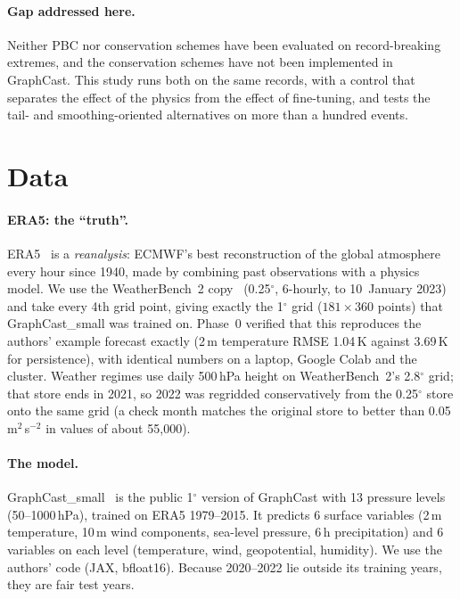 \documentclass{article}
\begin{document}
\paragraph{Gap addressed here.}
Neither PBC nor conservation schemes have been evaluated on record-breaking extremes, and the conservation schemes have
not been implemented in GraphCast. This study runs both on the same records, with a control that separates the effect
of the physics from the effect of fine-tuning, and tests the tail- and smoothing-oriented alternatives on more than a hundred events.

\section{Data}
\label{sec:data}

\paragraph{ERA5: the ``truth''.}
ERA5~\cite{hersbach2020era5} is a \emph{reanalysis}: ECMWF's best reconstruction of the global atmosphere every hour since 1940,
made by combining past observations with a physics model. We use the WeatherBench~2 copy~\cite{rasp2024wb2} (0.25$^\circ$, 6-hourly, to 10~January 2023)
and take every 4th grid point, giving exactly the 1$^\circ$ grid ($181\times360$ points) that GraphCast\_small was trained on. Phase~0
verified that this reproduces the authors' example forecast exactly (2\,m temperature RMSE 1.04\,K against 3.69\,K for persistence),
with identical numbers on a laptop, Google Colab and the cluster. Weather regimes use daily 500\,hPa height on WeatherBench~2's 2.8$^\circ$ grid;
that store ends in 2021, so 2022 was regridded conservatively from the 0.25$^\circ$ store onto the same grid (a check month matches the original store to
better than 0.05\,m$^2$\,s$^{-2}$ in values of about 55{,}000).

\paragraph{The model.}
GraphCast\_small~\cite{lam2023graphcast} is the public 1$^\circ$ version of GraphCast with 13 pressure levels (50--1000\,hPa), trained on ERA5 1979--2015.
It predicts 6 surface variables (2\,m temperature, 10\,m wind components, sea-level pressure, 6\,h precipitation)
and 6 variables on each level (temperature, wind, geopotential, humidity). We use the authors' code (JAX, bfloat16).
Because 2020--2022 lie outside its training years, they are fair test years.
\end{document}
